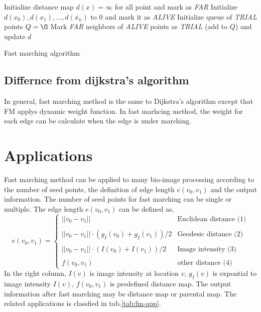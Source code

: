 \begin{algorithm}[H]
\label{alg:fast-marching}
\SetAlgoLined
{}
Initialize distance map $d(x) = \infty$ for all point and mark as \emph{FAR} \;
Initialize $d(x_0),d(x_1),\ldots,d(x_n)$ to $0$ and mark it as \emph{ALIVE} \;
Initialize queue of \emph{TRIAL} points $Q = \O$ \;
Mark \emph{FAR} neighbors of \emph{ALIVE} points as \emph{TRIAL} (add to $Q$) and update $d$ \;
\caption{Fast marching algorithm}
\end{algorithm}

\subsection{Differnce from dijkstra's algorithm}
In general, fast marching method is the same to Dijkstra's algorithm except that FM applys dynamic weight function. In fast marhcing method, the weight for each edge can be calculate when the edge is under marching.
\section{Applications}
Fast marching method can be applied to many bio-image processing according to the number of seed points, the definition of edge length $e(v_0,v_1)$ and the output information. The number of seed points for fast marching can be single or multiple. The edge length $e(v_0,v_1)$ can be defined as,
$$
e(v_0,v_1) = \left\{ 
    \begin{array}{lr}
    ||v_0 - v_1|| & \mbox{Euclidean distance (1)} \\
    \\
    ||v_0 - v_1|| \cdot (g_I(v_0) + g_I(v_1))/2 & \mbox{Geodesic distance (2)} \\
    \\
    ||v_0 - v_1|| \cdot (I(v_0) + I(v_1))/2 & \mbox{Image intensity (3)} \\
    \\
    f(v_0,v_1) & \mbox{other distance (4)}
    \end{array}
    \right.
$$
In the right column, $I(v)$ is image intensity at location $v$, $g_I(v)$ is expontial to image intensity $I(v)$, $f(v_0,v_1)$ is predefined distance map. The output information after fast marching may be distance map or parental map.  The related applications is classfied in tab.\ref{tab:fm-app}.\\

